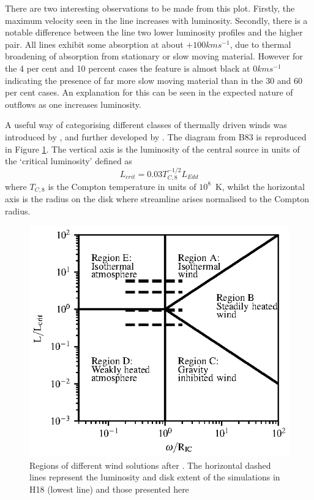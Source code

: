 \documentclass[a4paper,fleqn,usenatbib]{mnras}
\begin{document}
There are two interesting observations to be made from this plot. Firstly, the maximum velocity seen in 
the line increases with luminosity. Secondly, there is a notable difference between the line two lower luminosity 
profiles and the higher pair. All lines exhibit some absorption at about $+100kms^{-1}$, due to thermal 
broadening of absorption from stationary or slow moving material. However for the 4 per cent and 10 percent 
cases the feature is almost black at $0kms^{-1}$ indicating the presence of far more slow moving material than 
in the 30 and 60 per cent cases. An explanation for this can be seen in the expected nature of outflows as one 
increases luminosity. 

A useful way of categorising different classes of thermally driven winds was introduced 
by \cite[hereafter B83]{1983ApJ...271...70B}, and further developed by \cite[hereafter W96]{1996ApJ...461..767W}. The
diagram from B83 is reproduced in Figure  \ref{figure:regions}. The vertical axis is the luminosity of the central
source in units of the `critical luminosity' defined as
\begin{equation}
L_{crit}=0.03T_{C,8}^{-1/2}L_{Edd}
\label{L_crit}
\end{equation}
where $T_{C,8}$ is the Compton temperature in units of $10^8$~K,
whilst the horizontal axis is the radius on the disk where streamline arises normalised to the Compton radius. 

\begin{figure}
\includegraphics[width=\columnwidth]{figures/fig7.eps}
\caption{Regions of different wind solutions after \protect\cite{1983ApJ...271...70B}. The horizontal dashed 
lines represent the luminosity and disk extent of the simulations in H18
(lowest line) and those presented here}
\label{figure:regions}
\end{figure}
\end{document}
